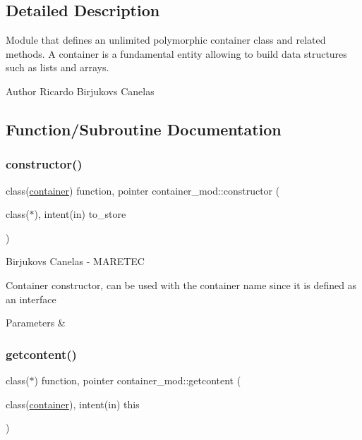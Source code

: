 \subsection{Detailed Description}
Module that defines an unlimited polymorphic container class and related methods. A container is a fundamental entity allowing to build data structures such as lists and arrays. 

\begin{DoxyAuthor}{Author}
Ricardo Birjukovs Canelas 
\end{DoxyAuthor}


\subsection{Function/\+Subroutine Documentation}
\mbox{\label{namespacecontainer__mod_a6262df4ff34024d566cf8261dc20a248}} 
\subsubsection{\texorpdfstring{constructor()}{constructor()}}
{\footnotesize\ttfamily class(\hyperlink{structcontainer__mod_1_1container}{container}) function, pointer container\+\_\+mod\+::constructor (\begin{DoxyParamCaption}\item[{class($\ast$), intent(in)}]{to\+\_\+store }\end{DoxyParamCaption})\hspace{0.3cm}{\ttfamily [private]}}



Birjukovs Canelas -\/ M\+A\+R\+E\+T\+EC 

Container constructor, can be used with the \textquotesingle{}container\textquotesingle{} name since it is defined as an interface 
\begin{DoxyParams}{Parameters}
{\em } & \\
\hline
\end{DoxyParams}
\mbox{\label{namespacecontainer__mod_a23a016e747d896622127c0c21dca9836}} 
\subsubsection{\texorpdfstring{getcontent()}{getcontent()}}
{\footnotesize\ttfamily class($\ast$) function, pointer container\+\_\+mod\+::getcontent (\begin{DoxyParamCaption}\item[{class(\hyperlink{structcontainer__mod_1_1container}{container}), intent(in)}]{this }\end{DoxyParamCaption})\hspace{0.3cm}{\ttfamily [private]}}



